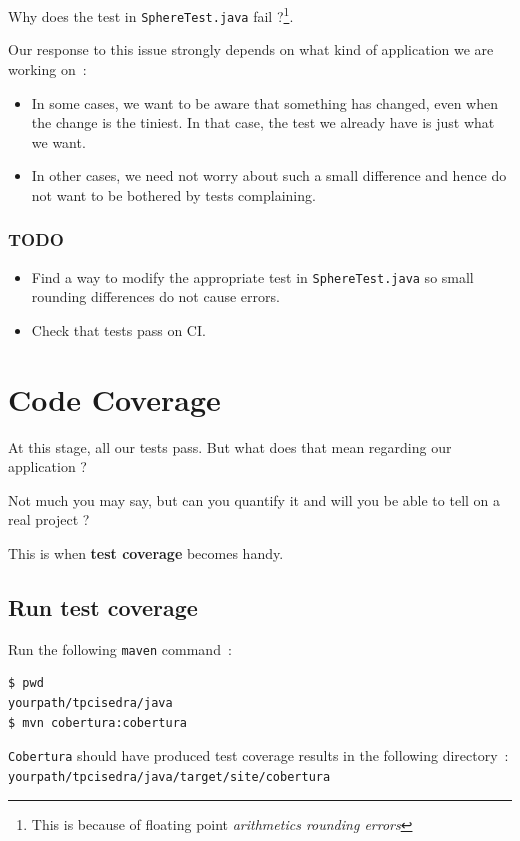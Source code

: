 \documentclass{article}
\begin{document}
Why does the test in \texttt{SphereTest.java} fail ?\footnote{This is because of floating point \emph{arithmetics rounding errors}}.

Our response to this issue strongly depends on what kind of application we are working on~:
\begin{itemize}
\item In some cases, we want to be aware that something has changed, even when the change is the tiniest. In that case, the test we already have is just what we want.
\item In other cases, we need not worry about such a small difference and hence do not want to be bothered by tests complaining.
\end{itemize}

\subsubsection{TODO}
\begin{itemize}
\item Find a way to modify the appropriate test in \texttt{SphereTest.java}
so small rounding differences do not cause errors.
\item Check that tests pass on CI.
\end{itemize}


\section{Code Coverage}

At this stage, all our tests pass. But what does that mean regarding our application ?

Not much you may say, but can you quantify it and will you be able to tell on a real project ?

This is when \textbf{test coverage} becomes handy.

\subsection{Run test coverage}

Run the following \texttt{maven} command~:
\begin{lstlisting}
$ pwd
yourpath/tpcisedra/java
$ mvn cobertura:cobertura
\end{lstlisting}

\texttt{Cobertura} should have produced test coverage results in the following directory~:\\
\texttt{yourpath/tpcisedra/java/target/site/cobertura}
\end{document}
